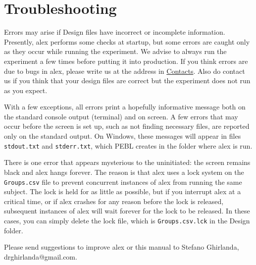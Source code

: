 \documentclass[11pt,]{article}
\begin{document}
\section{Troubleshooting}

Errors may arise if Design files have incorrect or incomplete
information. Presently, alex performs some checks at startup, but some
errors are caught only as they occur while running the experiment. We
advise to always run the experiment a few times before putting it into
production. If you think errors are due to bugs in alex, please write us
at the address in \hyperref[contacts]{Contacts}. Also do contact us if
you think that your design files are correct but the experiment does not
run as you expect.

With a few exceptions, all errors print a hopefully informative message
both on the standard console output (terminal) and on screen. A few
errors that may occur before the screen is set up, such as not finding
necessary files, are reported only on the standard output. On Windows,
these messages will appear in files \texttt{stdout.txt} and
\texttt{stderr.txt}, which PEBL creates in the folder where alex is run.

There is one error that appears mysterious to the uninitiated: the
screen remains black and alex hangs forever. The reason is that alex
uses a lock system on the \texttt{Groups.csv} file to prevent concurrent
instances of alex from running the same subject. The lock is held for as
little as possible, but if you interrupt alex at a critical time, or if
alex crashes for any reason before the lock is released, subsequent
instances of alex will wait forever for the lock to be released. In
these cases, you can simply delete the lock file, which is
\texttt{Groups.csv.lck} in the Design folder.


Please send suggestions to improve alex or this manual to Stefano
Ghirlanda, drghirlanda@gmail.com.
\end{document}
